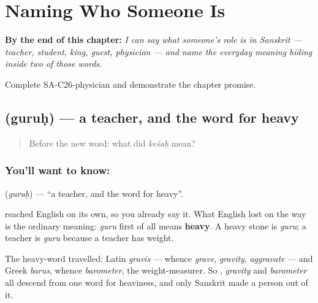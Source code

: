 
\chapter{Naming Who Someone Is}
\label{ch:sa-roles}

\begin{chapteropening}
\textbf{By the end of this chapter:} \emph{I can say what someone's role is in Sanskrit --- teacher, student, king, guest, physician --- and name the everyday meaning hiding inside two of those words.}

Complete SA-C26-physician and demonstrate the chapter promise.
\end{chapteropening}

\section[\texorpdfstring{\sk{गुरुः} (guruḥ)}{गुरुः (guruḥ)}]{ (guruḥ) — a teacher, and the word for heavy}

\label{lesson:SA-C26-teacher}



\begin{quote}
Before the new word: what did \emph{keśaḥ} mean?
\end{quote}

\subsection*{You'll want to know: }
\textbf{} (\emph{guruḥ}) — \textquotedblleft{}a teacher, and the word for heavy\textquotedblright{}.

\textbf{} reached English on its own, so you already say it. What English lost on the way is the ordinary meaning: \emph{guru} first of all means \textbf{heavy}. A heavy stone is \emph{guru}; a teacher is \emph{guru} because a teacher has weight.

The heavy-word travelled: Latin \emph{gravis} — whence \emph{grave}, \emph{gravity}, \emph{aggravate} — and Greek \emph{barus}, whence \emph{barometer}, the weight-measurer. So , \emph{gravity} and \emph{barometer} all descend from one word for heaviness, and only Sanskrit made a person out of it.

